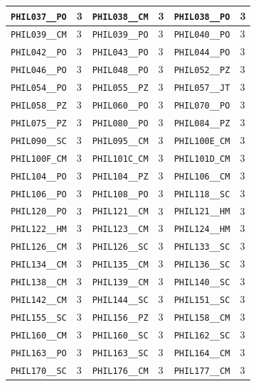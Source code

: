 \begin{longtable}{|l|l||l|l||l|l|}
    \verb|PHIL037__PO| & 3 & \verb|PHIL038__CM| & 3 & \verb|PHIL038__PO| & 3\\\hline
    \verb|PHIL039__CM| & 3 & \verb|PHIL039__PO| & 3 & \verb|PHIL040__PO| & 3\\\hline
    \verb|PHIL042__PO| & 3 & \verb|PHIL043__PO| & 3 & \verb|PHIL044__PO| & 3\\\hline
    \verb|PHIL046__PO| & 3 & \verb|PHIL048__PO| & 3 & \verb|PHIL052__PZ| & 3\\\hline
    \verb|PHIL054__PO| & 3 & \verb|PHIL055__PZ| & 3 & \verb|PHIL057__JT| & 3\\\hline
    \verb|PHIL058__PZ| & 3 & \verb|PHIL060__PO| & 3 & \verb|PHIL070__PO| & 3\\\hline
    \verb|PHIL075__PZ| & 3 & \verb|PHIL080__PO| & 3 & \verb|PHIL084__PZ| & 3\\\hline
    \verb|PHIL090__SC| & 3 & \verb|PHIL095__CM| & 3 & \verb|PHIL100E_CM| & 3\\\hline
    \verb|PHIL100F_CM| & 3 & \verb|PHIL101C_CM| & 3 & \verb|PHIL101D_CM| & 3\\\hline
    \verb|PHIL104__PO| & 3 & \verb|PHIL104__PZ| & 3 & \verb|PHIL106__CM| & 3\\\hline
    \verb|PHIL106__PO| & 3 & \verb|PHIL108__PO| & 3 & \verb|PHIL118__SC| & 3\\\hline
    \verb|PHIL120__PO| & 3 & \verb|PHIL121__CM| & 3 & \verb|PHIL121__HM| & 3\\\hline
    \verb|PHIL122__HM| & 3 & \verb|PHIL123__CM| & 3 & \verb|PHIL124__HM| & 3\\\hline
    \verb|PHIL126__CM| & 3 & \verb|PHIL126__SC| & 3 & \verb|PHIL133__SC| & 3\\\hline
    \verb|PHIL134__CM| & 3 & \verb|PHIL135__CM| & 3 & \verb|PHIL136__SC| & 3\\\hline
    \verb|PHIL138__CM| & 3 & \verb|PHIL139__CM| & 3 & \verb|PHIL140__SC| & 3\\\hline
    \verb|PHIL142__CM| & 3 & \verb|PHIL144__SC| & 3 & \verb|PHIL151__SC| & 3\\\hline
    \verb|PHIL155__SC| & 3 & \verb|PHIL156__PZ| & 3 & \verb|PHIL158__CM| & 3\\\hline
    \verb|PHIL160__CM| & 3 & \verb|PHIL160__SC| & 3 & \verb|PHIL162__SC| & 3\\\hline
    \verb|PHIL163__PO| & 3 & \verb|PHIL163__SC| & 3 & \verb|PHIL164__CM| & 3\\\hline
    \verb|PHIL170__SC| & 3 & \verb|PHIL176__CM| & 3 & \verb|PHIL177__CM| & 3\\\hline

\end{longtable}

